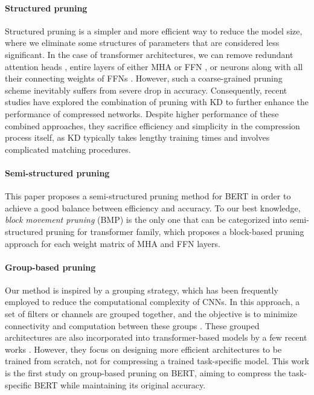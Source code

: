 \paragraph{Structured pruning} 
Structured pruning is a simpler and more efficient way to reduce the model size, where we eliminate some structures of parameters that are considered less significant. In the case of transformer architectures, we can remove redundant attention heads \cite{sixteen,voita,SMP}, entire layers of either MHA or FFN \cite{layer1,layer2}, or neurons along with all their connecting weights of FFNs \cite{earlybert}. However, such a coarse-grained pruning scheme inevitably suffers from severe drop in accuracy. Consequently, recent studies \cite{DynaBERT,block,Xia} have explored the combination of pruning with KD to further enhance the performance of compressed networks. Despite higher performance of these combined approaches, they sacrifice efficiency and simplicity in the compression process itself, as KD typically takes lengthy training times and involves complicated matching procedures.

\paragraph{Semi-structured pruning} This paper proposes a semi-structured pruning method for BERT in order to achieve a good balance between efficiency and accuracy. To our best knowledge, \textit{block movement pruning} (BMP) \cite{block} is the only one that can be categorized into semi-structured pruning for transformer family, which proposes a block-based pruning approach for each weight matrix of MHA and FFN layers. 

\paragraph{Group-based pruning} 
Our method is inspired by a grouping strategy, which has been frequently employed to reduce the computational complexity of CNNs. In this approach, a set of filters or channels are grouped together, and the objective is to minimize connectivity and computation between these groups \cite{DGC,Zhao,deeproot,xie,shufflenet}. These grouped architectures are also incorporated into transformer-based models by a few recent works \cite{GroupFormer,groupbert}. However, they focus on designing more efficient architectures to be trained from scratch, not for compressing a trained task-specific model. This work is the first study on group-based pruning on BERT, aiming to compress the task-specific BERT while maintaining its original accuracy.